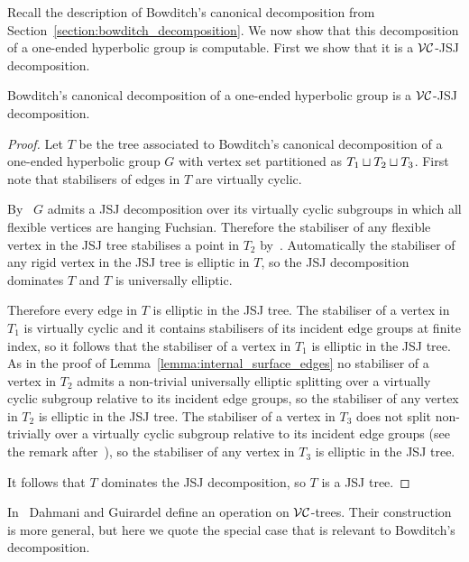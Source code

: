 Recall the description of Bowditch's canonical decomposition from Section~\ref{section:bowditch_decomposition}.
We now show that this decomposition of a one-ended hyperbolic group is computable.
First we show that it is a $\mathcal{VC}$-JSJ decomposition.

\begin{proposition}\label{proposition:bowditch_decomposition_is_a_JSJ}
  Bowditch's canonical decomposition of a one-ended hyperbolic group is a $\mathcal{VC}$-JSJ decomposition.
\end{proposition}

\begin{proof}
  Let $T$ be the tree associated to Bowditch's canonical decomposition of a one-ended hyperbolic group $G$ with vertex set partitioned as $T_1 \sqcup T_2 \sqcup T_3$.
  First note that stabilisers of edges in $T$ are virtually cyclic.

  By~\cite[Corollary 9.20]{guirardellevitt17} $G$ admits a JSJ decomposition over its virtually cyclic subgroups in which all flexible vertices are hanging Fuchsian.
  Therefore the stabiliser of any flexible vertex in the JSJ tree stabilises a point in $T_2$ by~\cite[Proposition 6.1]{bowditch98}.
  Automatically the stabiliser of any rigid vertex in the JSJ tree is elliptic in $T$, so the JSJ decomposition dominates $T$ and $T$ is universally elliptic.

  Therefore every edge in $T$ is elliptic in the JSJ tree.
  The stabiliser of a vertex in $T_1$ is virtually cyclic and it contains stabilisers of its incident edge groups at finite index, so it follows that the stabiliser of a vertex in $T_1$ is elliptic in the JSJ tree.
  As in the proof of Lemma~\ref{lemma:internal_surface_edges} no stabiliser of a vertex in $T_2$ admits a non-trivial universally elliptic splitting over a virtually cyclic subgroup relative to its incident edge groups, so the stabiliser of any vertex in $T_2$ is elliptic in the JSJ tree.
  The stabiliser of a vertex in $T_3$ does not split non-trivially over a virtually cyclic subgroup relative to its incident edge groups (see the remark after~\cite[Proposition 5.31]{bowditch98}), so the stabiliser of any vertex in $T_3$ is elliptic in the JSJ tree.

  It follows that $T$ dominates the JSJ decomposition, so $T$ is a JSJ tree.
\end{proof}

In~\cite{dahmaniguirardel11} Dahmani and Guirardel define an operation on $\mathcal{VC}$-trees.
Their construction is more general, but here we quote the special case that is relevant to Bowditch's decomposition.

